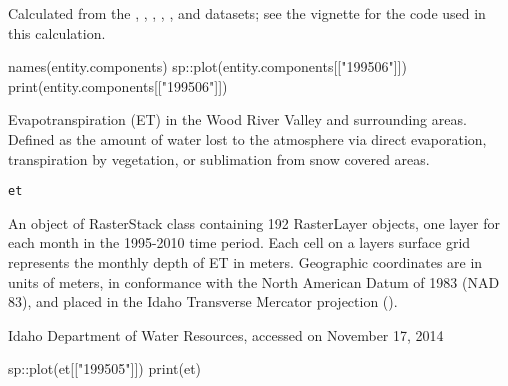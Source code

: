 \documentclass[a4paper]{book}
\begin{document}
%
\begin{Source}\relax
Calculated from the , ,
, , , and
 datasets;
see the  vignette for the \R{} code used in this calculation.
\end{Source}
%
\begin{Examples}
\begin{ExampleCode}
names(entity.components)
sp::plot(entity.components[["199506"]])
print(entity.components[["199506"]])

\end{ExampleCode}
\end{Examples}
%
\begin{Description}\relax
Evapotranspiration (ET) in the Wood River Valley and surrounding areas.
Defined as the amount of water lost to the atmosphere via direct evaporation,
transpiration by vegetation, or sublimation from snow covered areas.
\end{Description}
%
\begin{Usage}
\begin{verbatim}
et
\end{verbatim}
\end{Usage}
%
\begin{Format}
An object of RasterStack class containing 192 RasterLayer objects,
one layer for each month in the 1995-2010 time period.
Each cell on a layers surface grid represents the monthly depth of ET in meters.
Geographic coordinates are in units of meters, in conformance with the
North American Datum of 1983 (NAD 83), and placed in the
Idaho Transverse Mercator projection ().
\end{Format}
%
\begin{Source}\relax
Idaho Department of Water Resources, accessed on November 17, 2014
\end{Source}
%
\begin{SeeAlso}\relax
{}
\end{SeeAlso}
%
\begin{Examples}
\begin{ExampleCode}
sp::plot(et[["199505"]])
print(et)

\end{ExampleCode}
\end{Examples}
\end{document}
